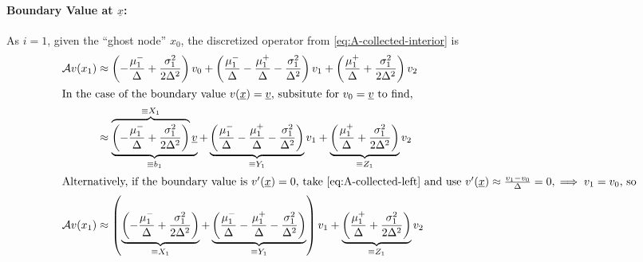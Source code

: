 \documentclass[11pt]{etk-article}
\begin{document}
\paragraph{Boundary Value at $\underline{x}$:}
As $i =1$, given the ``ghost node'' $x_0$, the discretized operator from \cref{eq:A-collected-interior} is
\begin{align}
\mathcal{A} v(x_1) &\approx \left(-\frac{\mu_1^{-}}{\Delta} +\frac{\sigma_1^2}{2 \Delta^2}\right)v_0 + \left(\frac{\mu_1^{-}}{\Delta} - \frac{\mu_1^{+}}{\Delta}-\frac{\sigma_1^2}{\Delta^2}\right)v_1 + \left(\frac{\mu_1^{+}}{\Delta} + \frac{\sigma_1^2}{2 \Delta^2}\right)v_2\label{eq:A-collected-left}\\
\intertext{In the case of the boundary value $v(\underline{x}) = \underline{v}$, subsitute for $v_0 =  \underline{v}$ to find,}
&\approx \underbrace{\overbrace{\left(-\frac{\mu_1^{-}}{\Delta} +\frac{\sigma_1^2}{2 \Delta^2}\right)}^{\equiv X_1}\underline{v}}_{\equiv b_1} +  \underbrace{\left(\frac{\mu_1^{-}}{\Delta} - \frac{\mu_1^{+}}{\Delta}-\frac{\sigma_1^2}{\Delta^2}\right)}_{\equiv Y_1}v_1 + \underbrace{\left(\frac{\mu_1^{+}}{\Delta} + \frac{\sigma_1^2}{2 \Delta^2}\right)}_{\equiv Z_1}v_2\\
\intertext{Alternatively, if the boundary value is $v'(\underline{x}) = 0$, take \cref{eq:A-collected-left} and use $v'(\underline{x}) \approx \frac{v_1-v_0}{\Delta} = 0, \implies v_1 = v_0$, so}
\mathcal{A} v(x_1) &\approx \left(\underbrace{\left(-\frac{\mu_1^{-}}{\Delta} +\frac{\sigma_1^2}{2 \Delta^2}\right)}_{\equiv X_1} + \underbrace{\left(\frac{\mu_1^{-}}{\Delta} - \frac{\mu_1^{+}}{\Delta}-\frac{\sigma_1^2}{\Delta^2}\right)}_{\equiv Y_1}\right)v_1 + \underbrace{\left(\frac{\mu_1^{+}}{\Delta} + \frac{\sigma_1^2}{2 \Delta^2}\right)}_{\equiv Z_1}v_2
\end{align}
\end{document}
